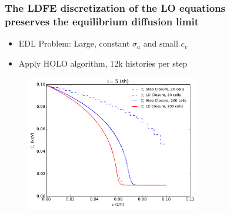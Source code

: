 \documentclass[xcolor=dvipsnames,hyperref={pdfpagelabels=false},unknownkeysallowed]{beamer}
\newcommand{\colG}[1]{{\color{Gray!110} #1}}
\newlength{\wideitemsep}
\let\olditem\item
\renewcommand{\item}{\setlength{\itemsep}{\wideitemsep}\olditem}
\begin{document}
\begin{frame}
    \frametitle{The LDFE discretization of the LO equations \\ preserves the equilibrium diffusion limit}
                \vspace{0.05in}
        \begin{itemize}
            \item EDL Problem: \colG{Large, constant $\sigma_a$ and small $c_v$}
                \vspace{-0.1in}
            \item Apply HOLO algorithm, 12k histories per step
        \end{itemize}
\begin{figure}
    \centering
    \includegraphics[width=0.6755799\textwidth]{diff_limit_compare.pdf}
\end{figure}
\end{frame}
\end{document}
